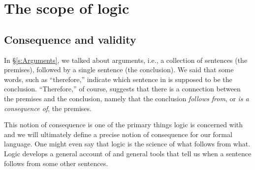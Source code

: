 \begin{practiceproblems}
\begin{enumerate}
\end{enumerate}

\end{practiceproblems}

\chapter{The scope of logic}
\label{s:Valid}




\section{Consequence and validity}

In \S\ref{s:Arguments}, we talked about arguments, i.e., a collection of sentences (the premises), followed by a single sentence (the conclusion). We said that some words, such as ``therefore,'' indicate which sentence in is supposed to be the conclusion. ``Therefore,'' of course, suggests that there is a connection between the premises and the conclusion, namely that the conclusion \emph{follows from}, or \emph{is a consequence of}, the premises.

This notion of consequence is one of the primary things logic is concerned with and we will ultimately define a precise notion of consequence for our formal language. One might even say that logic is the science of what follows from what.  Logic develops a general account of and general tools that tell us when a sentence follows from some other sentences.

